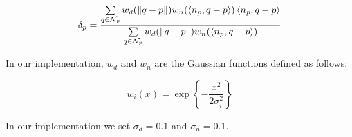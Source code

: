 \begin{equation}\label{eq:delta}  \delta_p = \dfrac{\sum\limits_{q \in \mathcal{N}_p} w_d(\left\lVert q - p\right\rVert)w_n(\left\langle n_p, q-p\right\rangle)\left\langle n_p, q-p\right\rangle}{\sum\limits_{q \in \mathcal{N}_p}w_d(\left\lVert q - p\right\rVert)w_n(\left\langle n_p, q-p\right\rangle)}\end{equation} 

In our implementation, $w_d$ and $w_n$ are the Gaussian functions defined as follows:

\begin{equation} w_i(x) = \exp\left\{-\dfrac{x^2}{2\sigma_i^2}\right\} \label{eq:weight}\end{equation} 

In our implementation we set $\sigma_d = 0.1$ and $\sigma_n = 0.1$.
